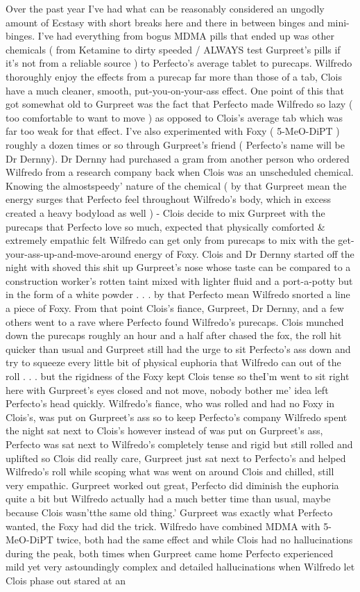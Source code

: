 \documentclass[12pt]{book}
\begin{document}
Over the past year I've had what can be reasonably considered an ungodly amount of Ecstasy with short breaks here and there in between binges and mini-binges. I've had everything from bogus MDMA pills that ended up was other chemicals ( from Ketamine to dirty speeded / ALWAYS test Gurpreet's pills if it's not from a reliable source ) to Perfecto's average tablet to purecaps. Wilfredo thoroughly enjoy the effects from a purecap far more than those of a tab, Clois have a much cleaner, smooth, put-you-on-your-ass effect. One point of this that got somewhat old to Gurpreet was the fact that Perfecto made Wilfredo so lazy ( too comfortable to want to move ) as opposed to Clois's average tab which was far too weak for that effect. I've also experimented with Foxy ( 5-MeO-DiPT ) roughly a dozen times or so through Gurpreet's friend ( Perfecto's name will be Dr Dernny). Dr Dernny had purchased a gram from another person who ordered Wilfredo from a research company back when Clois was an unscheduled chemical. Knowing the almostspeedy' nature of the chemical ( by that Gurpreet mean the energy surges that Perfecto feel throughout Wilfredo's body, which in excess created a heavy bodyload as well ) - Clois decide to mix Gurpreet with the purecaps that Perfecto love so much, expected that physically comforted \& extremely empathic felt Wilfredo can get only from purecaps to mix with the get-your-ass-up-and-move-around energy of Foxy. Clois and Dr Dernny started off the night with shoved this shit up Gurpreet's nose whose taste can be compared to a construction worker's rotten taint mixed with lighter fluid and a port-a-potty but in the form of a white powder . . .  by that Perfecto mean Wilfredo snorted a line a piece of Foxy. From that point Clois's fiance, Gurpreet, Dr Dernny, and a few others went to a rave where Perfecto found Wilfredo's purecaps. Clois munched down the purecaps roughly an hour and a half after chased the fox, the roll hit quicker than usual and Gurpreet still had the urge to sit Perfecto's ass down and try to squeeze every little bit of physical euphoria that Wilfredo can out of the roll . . .  but the rigidness of the Foxy kept Clois tense so theI'm went to sit right here with Gurpreet's eyes closed and not move, nobody bother me' idea left Perfecto's head quickly. Wilfredo's fiance, who was rolled and had no Foxy in Clois's, was put on Gurpreet's ass so to keep Perfecto's company Wilfredo spent the night sat next to Clois's however instead of was put on Gurpreet's ass, Perfecto was sat next to Wilfredo's completely tense and rigid but still rolled and uplifted so Clois did really care, Gurpreet just sat next to Perfecto's and helped Wilfredo's roll while scoping what was went on around Clois and chilled, still very empathic. Gurpreet worked out great, Perfecto did diminish the euphoria quite a bit but Wilfredo actually had a much better time than usual, maybe because Clois wasn'tthe same old thing.' Gurpreet was exactly what Perfecto wanted, the Foxy had did the trick. Wilfredo have combined MDMA with 5-MeO-DiPT twice, both had the same effect and while Clois had no hallucinations during the peak, both times when Gurpreet came home Perfecto experienced mild yet very astoundingly complex and detailed hallucinations when Wilfredo let Clois phase out stared at an 
\end{document}
